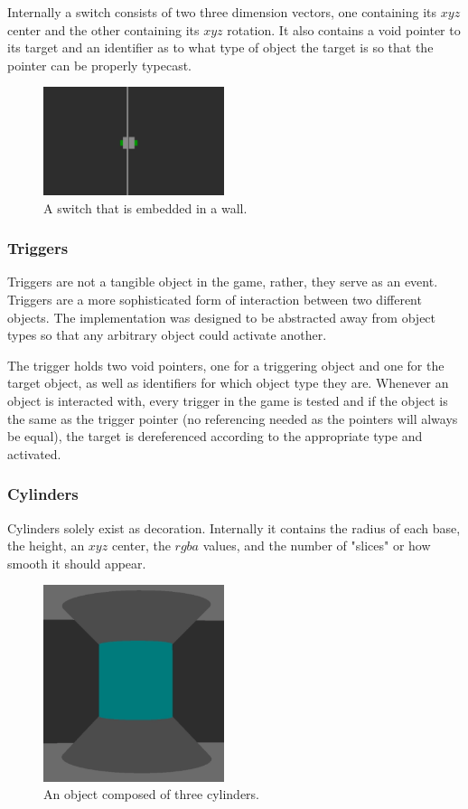 \documentclass{article}
\begin{document}
Internally a switch consists of two three dimension vectors, one containing its $xyz$ center and the other containing its $xyz$ rotation. It also contains a void pointer to its target and an identifier as to what type of object the target is so that the pointer can be properly typecast.

\begin{figure}[H]
	\centering
	\includegraphics[width=200px]{switch}
	\caption{A switch that is embedded in a wall.}
	\label{fig:3Dswitch}
\end{figure}

\subsubsection{Triggers} \label{subsubsec:Triggers}

Triggers are not a tangible object in the game, rather, they serve as an event. Triggers are a more sophisticated form of interaction between two different objects. The implementation was designed to be abstracted away from object types so that any arbitrary object could activate another. 

The trigger holds two void pointers, one for a triggering object and one for the target object, as well as identifiers for which object type they are. Whenever an object is interacted with, every trigger in the game is tested and if the object is the same as the trigger pointer (no referencing needed as the pointers will always be equal), the target is dereferenced according to the appropriate type and activated.

\subsubsection{Cylinders} \label{subsubsec:cylinders}

Cylinders solely exist as decoration. Internally it contains the radius of each base, the height, an $xyz$ center, the $rgba$ values, and the number of "slices" or how smooth it should appear.

\begin{figure}[H]
	\centering
	\includegraphics[width=200px]{cylinder}
	\caption{An object composed of three cylinders.}
	\label{fig:3DCylinder}
\end{figure}
\end{document}
